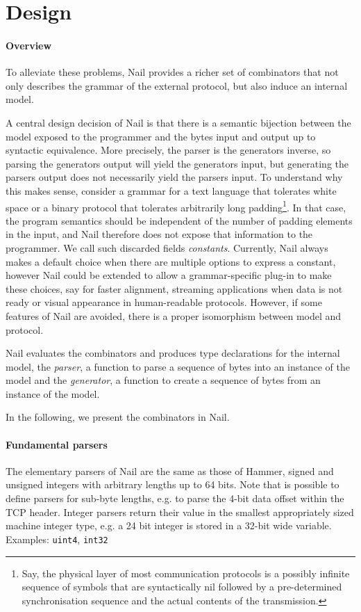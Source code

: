 \section{Design}
\label{s:design}

\paragraph{Overview}

To alleviate these problems, Nail provides a richer set of combinators that not only describes the
grammar of the external protocol, but also induce an internal model. 

A central design decision of Nail is that there is a semantic bijection between the model exposed to
the programmer and the bytes input and output up to syntactic equivalence. More precisely, the
parser is the generators inverse, so parsing the generators output will yield the generators input,
but generating the parsers output does not necessarily yield the parsers input. To understand why
this makes sense, consider a grammar for a text language that tolerates white space or a binary
protocol that tolerates arbitrarily long padding\footnote{Say, the physical layer of most
  communication protocols is a possibly infinite sequence of symbols that are syntactically nil
  followed by a pre-determined synchronisation sequence and the actual contents of the
  transmission.}. In that case, the program semantics should be independent of the number of padding
elements in the input, and Nail therefore does not expose that information to the programmer. We
call such discarded fields \emph{constants}. Currently, Nail always makes a default choice when
there are multiple options to express a constant, however Nail could be extended to allow a
grammar-specific plug-in to make these choices, say for faster alignment, streaming applications
when data is not ready or visual appearance in human-readable protocols. However, if some features
of Nail are avoided, there is a proper isomorphism between model and protocol.


Nail evaluates the combinators and produces type declarations for the internal model, the \textit{parser}, a function to parse a sequence of
bytes into an instance of the model and the \textit{generator}, a function to create a sequence of
bytes from an instance of the model.

In the following, we present the combinators in Nail.
\paragraph{Fundamental parsers}
The elementary parsers of Nail are the same as those of Hammer, signed and unsigned integers with
arbitrary lengths up to 64 bits. Note that is possible to define parsers for sub-byte lengths, e.g.
to parse the 4-bit data offset within the TCP header. Integer parsers return their value in the
smallest appropriately sized machine integer type, e.g. a 24 bit integer is stored in a 32-bit wide variable.\\
Examples: \texttt{uint4}, \texttt{int32}

